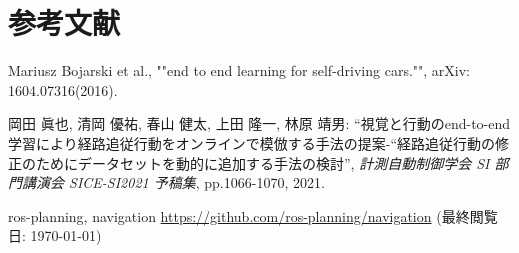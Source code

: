 \chapter*{参考文献}

Mariusz Bojarski et al., ""end to end learning for self-driving cars."", arXiv: 1604.07316(2016).

岡田 眞也, 清岡 優祐, 春山 健太, 上田 隆一, 林原 靖男: ``視覚と行動のend-to-end学習により経路追従行動をオンラインで模倣する手法の提案-“経路追従行動の修正のためにデータセットを動的に追加する手法の検討'', \textit{計測自動制御学会 SI 部門講演会 SICE-SI2021 予稿集}, pp.1066-1070, 2021. 

ros-planning, navigation
\url{https://github.com/ros-planning/navigation}
(最終閲覧日: \today)

